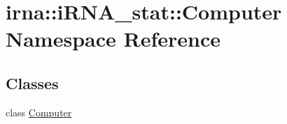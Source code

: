 \hypertarget{namespaceirna_1_1iRNA__stat_1_1Computer}{
\section{irna\-:\-:i\-R\-N\-A\-\_\-stat\-:\-:\-Computer \-Namespace \-Reference}
\label{namespaceirna_1_1iRNA__stat_1_1Computer}
}
\subsection*{\-Classes}
\begin{DoxyCompactItemize}
\item 
class \hyperlink{classirna_1_1iRNA__stat_1_1Computer_1_1Computer}{\-Computer}
\end{DoxyCompactItemize}
